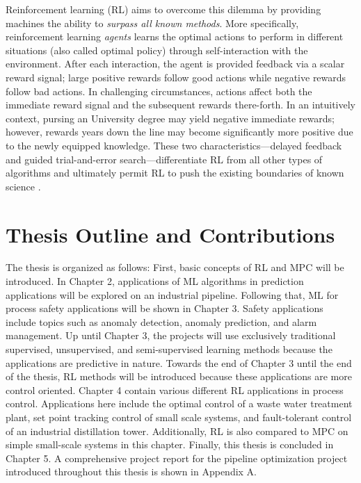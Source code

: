 Reinforcement learning (RL) aims to overcome this dilemma by providing machines the ability to \textit{surpass all known methods}.  More specifically, reinforcement learning \textit{agents} learns the optimal actions to perform in different situations (also called optimal policy) through self-interaction with the environment.  After each interaction, the agent is provided feedback via a scalar reward signal; large positive rewards follow good actions while negative rewards follow bad actions.  In challenging circumstances, actions affect both the immediate reward signal and the subsequent rewards there-forth. In an intuitively context, pursing an University degree may yield negative immediate rewards; however, rewards years down the line may become significantly more positive due to the newly equipped knowledge.  These two characteristics---delayed feedback and guided trial-and-error search---differentiate RL from all other types of algorithms and ultimately permit RL to push the existing boundaries of known science \cite{sutton}.

\section{Thesis Outline and Contributions}
The thesis is organized as follows: First, basic concepts of RL and MPC will be introduced.  In Chapter 2, applications of ML algorithms in prediction applications will be explored on an industrial pipeline.  Following that, ML for process safety applications will be shown in Chapter 3. Safety applications include topics such as anomaly detection, anomaly prediction, and alarm management. Up until Chapter 3, the projects will use exclusively traditional supervised, unsupervised, and semi-supervised learning methods because the applications are predictive in nature.  Towards the end of Chapter 3 until the end of the thesis, RL methods will be introduced because these applications are more control oriented. Chapter 4 contain various different RL applications in process control. Applications here include the optimal control of a waste water treatment plant, set point tracking control of small scale systems, and fault-tolerant control of an industrial distillation tower. Additionally, RL is also compared to MPC on simple small-scale systems in this chapter. Finally, this thesis is concluded in Chapter 5.  A comprehensive project report for the pipeline optimization project introduced throughout this thesis is shown in Appendix A.

